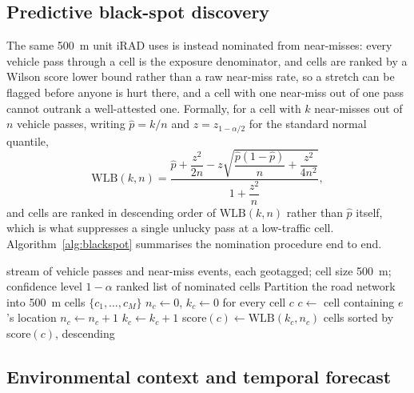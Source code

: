 \documentclass[journal]{IEEEtran}
\begin{document}
\subsection{Predictive black-spot discovery}

The same 500~m unit iRAD uses is instead nominated from near-misses: every vehicle pass through a cell is the exposure denominator, and cells are ranked by a Wilson score lower bound rather than a raw near-miss rate, so a stretch can be flagged before anyone is hurt there, and a cell with one near-miss out of one pass cannot outrank a well-attested one. Formally, for a cell with $k$ near-misses out of $n$ vehicle passes, writing $\hat p = k/n$ and $z = z_{1-\alpha/2}$ for the standard normal quantile,
\begin{equation}
\mathrm{WLB}(k,n) = \frac{\hat p + \dfrac{z^2}{2n} - z\sqrt{\dfrac{\hat p (1-\hat p)}{n} + \dfrac{z^2}{4n^2}}}{1 + \dfrac{z^2}{n}},
\label{eq:wilson}
\end{equation}
and cells are ranked in descending order of $\mathrm{WLB}(k,n)$ rather than $\hat p$ itself, which is what suppresses a single unlucky pass at a low-traffic cell. Algorithm~\ref{alg:blackspot} summarises the nomination procedure end to end.

\begin{algorithm}[t]
\caption{Predictive black-spot nomination}
\label{alg:blackspot}
\begin{algorithmic}[1]
\Require stream of vehicle passes and near-miss events, each geotagged; cell size 500~m; confidence level $1-\alpha$
\Ensure ranked list of nominated cells
\State Partition the road network into 500~m cells $\{c_1, \dots, c_M\}$
\State $n_c \gets 0$, $k_c \gets 0$ for every cell $c$
  \State $c \gets$ cell containing $e$'s location
  \State $n_c \gets n_c + 1$ 
    \State $k_c \gets k_c + 1$
  \EndIf
\EndFor
{}
  \State score$(c) \gets \mathrm{WLB}(k_c, n_c)$ 
\EndFor
\State \Return cells sorted by score$(c)$, descending
\end{algorithmic}
\end{algorithm}

\subsection{Environmental context and temporal forecast}
\end{document}
